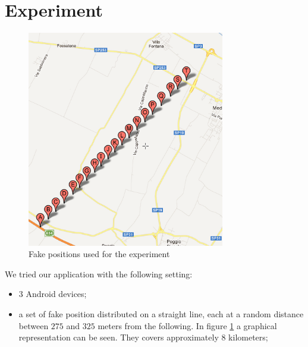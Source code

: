 \section{Experiment}
	\begin{figure}[htbp]
	\centering
	\includegraphics[width=3.4in]{imgs/punti_mappa.png}
	\caption{Fake positions used for the experiment}
	\label{fig:positions_experiment}
	\end{figure}

We tried our application with the following setting:
\begin{itemize}
	\item 3 Android devices;
	\item a set of fake position distributed on a straight line, each at a random distance between $275$ and $325$ meters from the following. In figure \ref{fig:positions_experiment} a graphical representation can be seen. They covers approximately $8$ kilometers;
\end{itemize}

